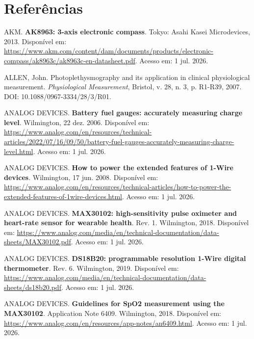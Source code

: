 \documentclass[a4paper,12pt]{article}
\begin{document}
\clearpage
{}
\section*{Referências}

\noindent AKM. \textbf{AK8963: 3-axis electronic compass}. Tokyo: Asahi Kasei Microdevices, 2013. Disponível em: \url{https://www.akm.com/content/dam/documents/products/electronic-compass/ak8963c/ak8963c-en-datasheet.pdf}. Acesso em: 1 jul. 2026.\par\medskip

\noindent ALLEN, John. Photoplethysmography and its application in clinical physiological measurement. \emph{Physiological Measurement}, Bristol, v. 28, n. 3, p. R1-R39, 2007. DOI: 10.1088/0967-3334/28/3/R01.\par\medskip

\noindent ANALOG DEVICES. \textbf{Battery fuel gauges: accurately measuring charge level}. Wilmington, 22 dez. 2006. Disponível em: \url{https://www.analog.com/en/resources/technical-articles/2022/07/16/09/50/battery-fuel-gauges-accurately-measuring-charge-level.html}. Acesso em: 1 jul. 2026.\par\medskip

\noindent ANALOG DEVICES. \textbf{How to power the extended features of 1-Wire devices}. Wilmington, 17 jun. 2008. Disponível em: \url{https://www.analog.com/en/resources/technical-articles/how-to-power-the-extended-features-of-1wire-devices.html}. Acesso em: 1 jul. 2026.\par\medskip

\noindent ANALOG DEVICES. \textbf{MAX30102: high-sensitivity pulse oximeter and heart-rate sensor for wearable health}. Rev. 1. Wilmington, 2018. Disponível em: \url{https://www.analog.com/media/en/technical-documentation/data-sheets/MAX30102.pdf}. Acesso em: 1 jul. 2026.\par\medskip

\noindent ANALOG DEVICES. \textbf{DS18B20: programmable resolution 1-Wire digital thermometer}. Rev. 6. Wilmington, 2019. Disponível em: \url{https://www.analog.com/media/en/technical-documentation/data-sheets/ds18b20.pdf}. Acesso em: 1 jul. 2026.\par\medskip

\noindent ANALOG DEVICES. \textbf{Guidelines for SpO2 measurement using the MAX30102}. Application Note 6409. Wilmington, 2018. Disponível em: \url{https://www.analog.com/en/resources/app-notes/an6409.html}. Acesso em: 1 jul. 2026.\par\medskip
\end{document}
